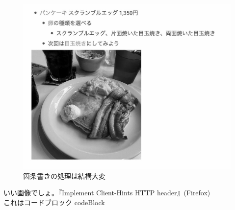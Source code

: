 \begin{figure}[h]
  \begin{center}
     \includegraphics[width=0.7\linewidth]{./cmyk-gray-gyazo-images/retina_pancake.jpg}
     \caption{箇条書きの処理は結構大変}
     \label{xslt-story}
  \end{center}
\end{figure}
いい画像でしょ。『Implement Client-Hints HTTP header』(Firefox)\\

これはコードブロック
codeBlock



